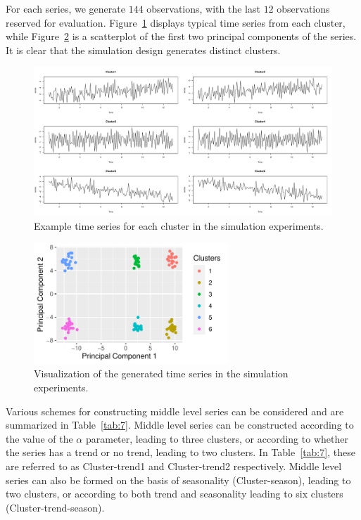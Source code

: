 \documentclass[a4paper,review,12pt,authoryear]{elsarticle}
\begin{document}
For each series, we generate $144$ observations, with the last $12$ observations reserved for evaluation. Figure~\ref{fig:simu_emps} displays typical time series from each cluster, while Figure~\ref{fig:simu_pca} is a scatterplot of the first two principal components of the series. It is clear that the simulation design generates distinct clusters.

\begin{figure}[h!]
\centering
\includegraphics[width=\textwidth]{figures/simu_example.pdf}
\caption{\label{fig:simu_emps}Example time series for each cluster in the simulation experiments.}
\end{figure}

\begin{figure}[h!]
    \centering
    \includegraphics[width=0.65\textwidth]{figures/simu_pca.pdf}
    \caption{\label{fig:simu_pca}Visualization of the generated time series in the simulation experiments.}
\end{figure}






Various schemes for constructing middle level series can be considered and are summarized in Table~\ref{tab:7}. Middle level series can be constructed according to the value of the $\alpha$ parameter, leading to three clusters, or according to whether the series has a trend or no trend, leading to two clusters. In Table~\ref{tab:7}, these are referred to as Cluster-trend1 and Cluster-trend2 respectively. Middle level series can also be formed on the basis of seasonality (Cluster-season), leading to two clusters, or according to both trend and seasonality leading to six clusters (Cluster-trend-season).
\end{document}
